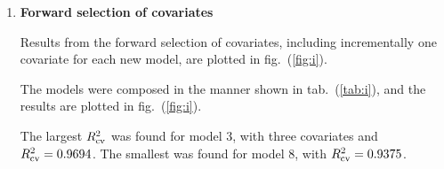 \documentclass[a4paper,11pt]{article}
\begin{document}
\begin{enumerate}[resume*]
        The numerical code for finding the cross validated $R^2$ is available online\footnote{\url{http://www.uio.no/studier/emner/matnat/math/STK4900/v11/crossvalidated-R2.html}}. The model was evaluated using the call \texttt{cv.R2(weightmod\_5}, where \texttt{weightmod\_5} is the linear model based on eq.~(\ref{eq:fullmodel}).  

        The cross validated correlation coefficient was found to be $R^2_{\rm cv} = 0.9375$. 

    \item \textbf{Forward selection of covariates}

        Results from the forward selection of covariates, including incrementally one covariate for each new model, are plotted in fig.~(\ref{fig:i}).

        The models were composed in the manner shown in tab.~(\ref{tab:i}), and the results are plotted in fig.~(\ref{fig:i}). 

        The largest $R^2_{\rm cv}$ was found for model 3, with three covariates and $R_{\rm cv}^2 = 0.9694$. The smallest was found for model 8, with $R^2_{\rm cv} = 0.9375$.

        \begin{table}
            \scriptsize
            \centering
            \caption{Multiple correlation coefficient squared $R$, adjusted  $R^2$ and cross validated $R^2_{\rm cv}$, see eq.~(\ref{eq:rsquared_crossval}), for different model covariates with outcome log(\texttt{WEIGHT}). The results are plotted in fig.~(\ref{fig:i}), and the largest $R^2_{cv}$ is obtained for model 3, with three covariates: \texttt{CHEST}, \texttt{LENGTH} and \texttt{HEADWTH}. }
            \label{tab:i}
        \end{table}


\end{enumerate}
\end{document}
